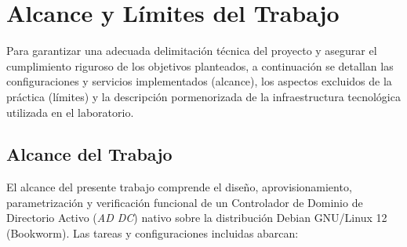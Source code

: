 
\section{Alcance y Límites del Trabajo}

Para garantizar una adecuada delimitación técnica del proyecto y asegurar el cumplimiento riguroso de los objetivos planteados, a continuación se detallan las configuraciones y servicios implementados (alcance), los aspectos excluidos de la práctica (límites) y la descripción pormenorizada de la infraestructura tecnológica utilizada en el laboratorio.

\subsection{Alcance del Trabajo}

El alcance del presente trabajo comprende el diseño, aprovisionamiento, parametrización y verificación funcional de un Controlador de Dominio de Directorio Activo (\textit{AD DC}) nativo sobre la distribución Debian GNU/Linux 12 (Bookworm). Las tareas y configuraciones incluidas abarcan:

